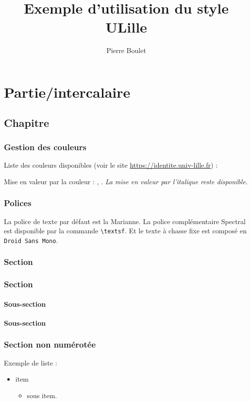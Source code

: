 \documentclass[fontsize=10pt,oneside]{scrreprt}
\title{Exemple d'utilisation du style ULille}
\author{Pierre Boulet}
\begin{document}
\maketitle

\pagecolor{Blanc}

\tableofcontents

\part*{Partie/intercalaire}

\chapter{Chapitre}

\section{Gestion des couleurs}

Liste des couleurs disponibles (voir le site \url{https://identite.univ-lille.fr}) :

\ListeCouleurs

Mise en valeur par la couleur : , .
\emph{La mise en valeur par l'italique reste disponible.}

\section{Polices}
La police de texte par défaut est la Marianne. La police complémentaire \textsf{Spectral} est disponible par la commande \verb|\textsf|. Et le texte à chasse fixe est composé en \texttt{Droid Sans Mono}.

\section{Section}
\lipsum[1-2]


\section{Section}
\subsection{Sous-section}
\lipsum[3]
\subsection{Sous-section}
\lipsum[4]

\section*{Section non numérotée}
Exemple de liste :
\begin{itemize}
  \item item
  \begin{itemize}
    \item sous item.
  \end{itemize}
\end{itemize}
\end{document}
